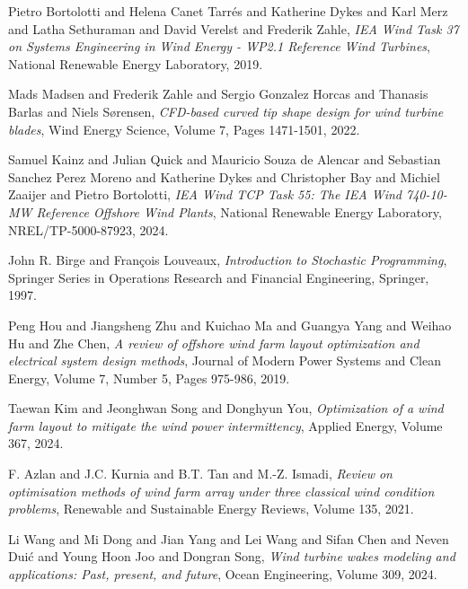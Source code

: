 \documentclass[preprint,12pt]{elsarticle}
\begin{document}
\begin{thebibliography}{00}
Pietro Bortolotti and Helena Canet Tarrés and Katherine Dykes and Karl Merz and Latha Sethuraman and David Verelst and Frederik Zahle,
\textit{IEA Wind Task 37 on Systems Engineering in Wind Energy - WP2.1 Reference Wind Turbines},
National Renewable Energy Laboratory,
2019.

Mads Madsen and Frederik Zahle and Sergio Gonzalez Horcas and Thanasis Barlas and Niels Sørensen,
\textit{CFD-based curved tip shape design for wind turbine blades},
Wind Energy Science,
Volume 7,
Pages 1471-1501,
2022.

Samuel Kainz and Julian Quick and Mauricio Souza de Alencar and Sebastian Sanchez Perez Moreno and Katherine Dykes and Christopher Bay and Michiel Zaaijer and Pietro Bortolotti,
\textit{IEA Wind TCP Task 55: The IEA Wind 740-10-MW Reference Offshore Wind Plants},
National Renewable Energy Laboratory,
NREL/TP-5000-87923,
2024.

John R. Birge and François Louveaux,
\textit{Introduction to Stochastic Programming},
Springer Series in Operations Research and Financial Engineering,
Springer,
1997.



Peng Hou and Jiangsheng Zhu and Kuichao Ma and Guangya Yang and Weihao Hu and Zhe Chen,
\textit{A review of offshore wind farm layout optimization and electrical system design methods},
Journal of Modern Power Systems and Clean Energy,
Volume 7,
Number 5,
Pages 975-986,
2019.

Taewan Kim and Jeonghwan Song and Donghyun You,
\textit{Optimization of a wind farm layout to mitigate the wind power intermittency},
Applied Energy,
Volume 367,
2024.

F. Azlan and J.C. Kurnia and B.T. Tan and M.-Z. Ismadi,
\textit{Review on optimisation methods of wind farm array under three classical wind condition problems},
Renewable and Sustainable Energy Reviews,
Volume 135,
2021.

Li Wang and Mi Dong and Jian Yang and Lei Wang and Sifan Chen and Neven Duić and Young Hoon Joo and Dongran Song,
\textit{Wind turbine wakes modeling and applications: Past, present, and future},
Ocean Engineering,
Volume 309,
2024.


\end{thebibliography}
\end{document}
